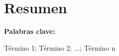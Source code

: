\chapter*{Resumen}

\lipsum[1-2]

\vspace{1cm}

\textbf{Palabras clave:}

Término 1; Término 2; ...; Término n
	 
\vfill